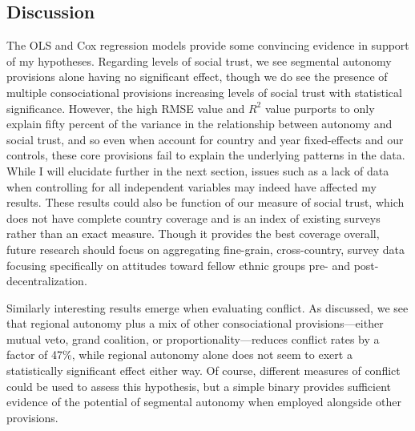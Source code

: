 \documentclass[12pt]{article}
\begin{document}
\subsection{Discussion} 
The OLS and Cox regression models provide some convincing evidence in support of my hypotheses. Regarding levels of social trust, we see segmental autonomy provisions alone having no significant effect, though we do see the presence of multiple consociational provisions increasing levels of social trust with statistical significance. However, the high RMSE value and $R^2$ value purports to only explain fifty percent of the variance in the relationship between autonomy and social trust, and so even when account for country and year fixed-effects and our controls, these core provisions fail to explain the underlying patterns in the data. While I will elucidate further in the next section, issues such as a lack of data when controlling for all independent variables may indeed have affected my results. These results could also be function of our measure of social trust, which does not have complete country coverage and is an index of existing surveys rather than an exact measure. Though it provides the best coverage overall, future research should focus on aggregating fine-grain, cross-country, survey data focusing specifically on attitudes toward fellow ethnic groups pre- and post-decentralization. 

Similarly interesting results emerge when evaluating conflict. As discussed, we see that regional autonomy plus a mix of other consociational provisions---either mutual veto, grand coalition, or proportionality---reduces conflict rates by a factor of 47\%, while regional autonomy alone does not seem to exert a statistically significant effect either way. Of course, different measures of conflict could be used to assess this hypothesis, but a simple binary provides sufficient evidence of the potential of segmental autonomy when employed alongside other provisions.  
\end{document}
